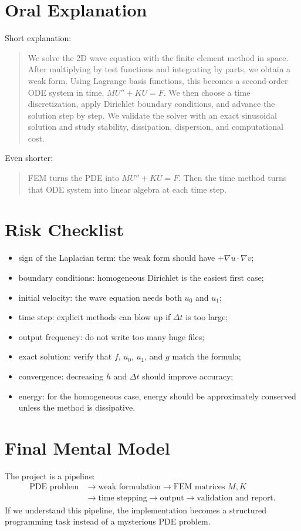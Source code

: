 \documentclass[11pt,a4paper]{article}
\begin{document}
\section{Oral Explanation}
Short explanation:
\begin{quote}
We solve the 2D wave equation with the finite element method in space. After multiplying
by test functions and integrating by parts, we obtain a weak form. Using Lagrange basis
functions, this becomes a second-order ODE system in time, \(M U'' + K U = F\).
We then choose a time discretization, apply Dirichlet boundary conditions, and advance
the solution step by step. We validate the solver with an exact sinusoidal solution and
study stability, dissipation, dispersion, and computational cost.
\end{quote}

Even shorter:
\begin{quote}
FEM turns the PDE into \(M U'' + K U = F\). Then the time method turns that ODE system
into linear algebra at each time step.
\end{quote}

\section{Risk Checklist}
\begin{itemize}
\item sign of the Laplacian term: the weak form should have \(+\nabla u\cdot\nabla v\);
\item boundary conditions: homogeneous Dirichlet is the easiest first case;
\item initial velocity: the wave equation needs both \(u_0\) and \(u_1\);
\item time step: explicit methods can blow up if \(\Delta t\) is too large;
\item output frequency: do not write too many huge files;
\item exact solution: verify that \(f\), \(u_0\), \(u_1\), and \(g\) match the formula;
\item convergence: decreasing \(h\) and \(\Delta t\) should improve accuracy;
\item energy: for the homogeneous case, energy should be approximately conserved unless
the method is dissipative.
\end{itemize}

\section{Final Mental Model}
The project is a pipeline:
\[
\begin{aligned}
\text{PDE problem}
&\to
\text{weak formulation}
\to
\text{FEM matrices } M,K \\
&\to
\text{time stepping}
\to
\text{output}
\to
\text{validation and report}.
\end{aligned}
\]
If we understand this pipeline, the implementation becomes a structured programming task
instead of a mysterious PDE problem.
\end{document}
